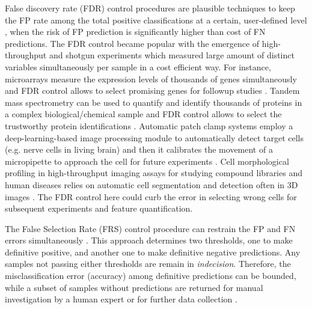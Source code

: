 \documentclass{article}
\begin{document}
False discovery rate (FDR) control procedures are plausible techniques to keep the FP rate among the total positive classifications at a certain, user-defined level \cite{Benjamini1995Controlling}, when the risk of FP prediction is significantly higher than cost of FN predictions. The FDR control became popular with the emergence of high-throughput and shotgun experiments which measured large amount of distinct variables simultaneously per sample in a cost efficient way. For instance, microarrays measure the expression levels of thousands of genes simultaneously and FDR control allows to select promising genes for followup studies \cite{storey2002direct,storey2003statistical,barber2015controlling}. Tandem mass spectrometry can be used to quantify and identify thousands of proteins in a complex biological/chemical sample and FDR control allows to select the trustworthy protein identifications \cite{elias2007target}. Automatic patch clamp systems employ a deep-learning-based image processing module to automatically detect target cells (e.g. nerve cells in living brain) and then it calibrates the movement of a micropipette to approach the cell for future experiments \cite{koos2021automatic}. Cell morphological profiling in high-throughput imaging assays for studying compound libraries and human diseases \cite{moshkov2024learning} relies on automatic cell segmentation and detection often in 3D images \cite{falk2019u}. The FDR control here could curb the error in selecting wrong cells for subsequent experiments and feature quantification. 

The False Selection Rate (FRS) control procedure can restrain the FP and FN errors simultaneously \cite{zhao2023controlling}. This approach determines two thresholds, one to make definitive positive, and another one to make definitive negative predictions. Any samples not passing either thresholds are remain in {\em indecision}. Therefore, the misclassification error (accuracy) among definitive predictions can be bounded, while a subset of samples without predictions are returned for manual investigation by a human expert or for further data collection \cite{rava2021burden}. 
\end{document}
